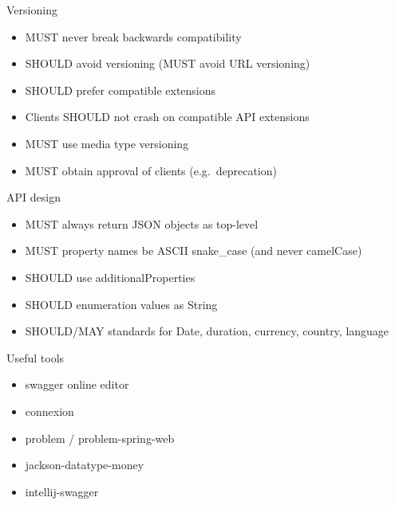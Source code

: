 \documentclass[10pt]{beamer}
\begin{document}
\begin{frame}{Versioning}

  \begin{itemize}

    \item
          MUST never break backwards compatibility
    \item
          SHOULD avoid versioning (MUST avoid URL versioning)
    \item
          SHOULD prefer compatible extensions
    \item
          Clients SHOULD not crash on compatible API extensions
    \item
          MUST use media type versioning
    \item
          MUST obtain approval of clients (e.g.~deprecation)
  \end{itemize}

\end{frame}

\begin{frame}{API design}

  \begin{itemize}

    \item
          MUST always return JSON objects as top-level
    \item
          MUST property names be ASCII snake\_case (and never camelCase)
    \item
          SHOULD use additionalProperties
    \item
          SHOULD enumeration values as String
    \item
          SHOULD/MAY standards for Date, duration, currency, country, language
  \end{itemize}

\end{frame}

\begin{frame}{Useful tools}

  \begin{itemize}

    \item
          swagger online editor
    \item
          connexion
    \item
          problem / problem-spring-web
    \item
          jackson-datatype-money
    \item
          intellij-swagger
  \end{itemize}

\end{frame}
\end{document}
